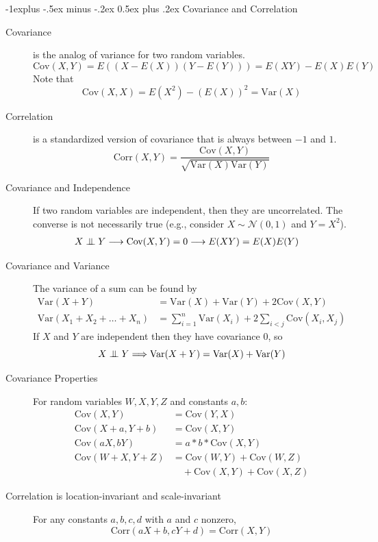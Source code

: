 \documentclass[10pt,landscape]{article}
\makeatletter
\newcommand\independent{\protect\mathpalette{\protect\independenT}{\perp}}
\def\independenT#1#2{\mathrel{\setbox0\hbox{$#1#2$}%
    \copy0\kern-\wd0\mkern4mu\box0}}
\newcommand{\var}{\textrm{Var}}
\newcommand{\cov}{\textrm{Cov}}
\newcommand{\corr}{\textrm{Corr}}
\newcommand{\N}{\mathcal{N}}
\renewcommand{\subsection}{\@startsection{subsection}{2}{0mm}%
                                {-1explus -.5ex minus -.2ex}%
                                {0.5ex plus .2ex}%
                                {\normalfont\normalsize\bfseries}}
\makeatother
\begin{document}
\begin{multicols*}{3}
\subsection{Covariance and Correlation}
\begin{description}
\item [Covariance] is the analog of variance for two random variables.
    \[\cov(X, Y) = E\left((X - E(X))(Y - E(Y))\right) = E(XY) - E(X)E(Y)\]
    Note that 
    \[\cov(X, X) = E(X^2) - (E(X))^2 =  \var(X)\]
\item [Correlation] is a standardized version of covariance that is always between $-1$ and $1$.
    \[\corr(X, Y) = \frac{\cov(X, Y)}{\sqrt{\var(X)\var(Y)}} \]
\item [Covariance and Independence] If two random variables are independent, then they are uncorrelated. The converse is not necessarily true (e.g., consider $X \sim \N(0,1)$ and $Y=X^2$).
    \begin{align*}
    	X \independent Y &\longrightarrow \cov(X, Y) = 0 \longrightarrow E(XY) = E(X)E(Y)
    \end{align*}
\item [Covariance and Variance]  The variance of a sum can be found by
    \begin{align*}
        \var(X + Y) &= \var(X) + \var(Y) + 2\cov(X, Y) \\
        \var(X_1 + X_2 + \dots + X_n ) &= \sum_{i = 1}^{n}\var(X_i) + 2\sum_{i < j} \cov(X_i, X_j)
    \end{align*}
    If $X$ and $Y$ are independent then they have covariance $0$, so
    \[X \independent Y \Longrightarrow \var(X + Y) = \var(X) + \var(Y)\]
\item [Covariance Properties]  For random variables $W, X, Y, Z$ and constants $a, b$:
    \begin{align*}
    	\cov(X, Y) &= \cov(Y, X) \\
        \cov(X + a, Y + b) &= \cov(X, Y) \\
        \cov(aX, bY) &= a*b*\cov(X, Y) \\
        \cov(W + X, Y + Z) &= \cov(W, Y) + \cov(W, Z)\\
        &\quad + \cov(X, Y) + \cov(X, Z)
    \end{align*}
\item [Correlation is location-invariant and scale-invariant] For any constants $a,b,c,d$ with $a$ and $c$ nonzero,
   \[ \corr(aX + b, cY + d) = \corr(X, Y) \]
\end{description}%


\end{multicols*}
\end{document}
